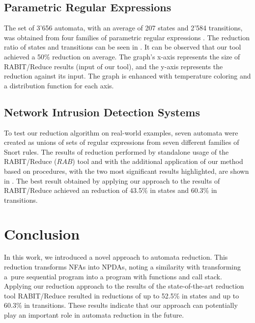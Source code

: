 \documentclass{ExcelAtFIT}
\begin{document}
	\subsection{Parametric Regular Expressions}
		The set of 3'656 automata, with an average of 207 states and 2'584 transitions, was obtained from four families of parametric regular expressions \cite{Regex_param}. The reduction ratio of states and transitions can be seen in . It can be observed that our tool achieved a 50\% reduction on average. The graph's x-axis represents the size of RABIT/Reduce results (input of our tool), and the y-axis represents the reduction against its input. The graph is enhanced with temperature coloring and a distribution function for each axis.

	\subsection{Network Intrusion Detection Systems}
		To test our reduction algorithm on real-world examples, seven automata were created as unions of sets of regular expressions from seven different families of Snort rules. The results of reduction performed by standalone usage of the RABIT/Reduce ($RAB$) tool and with the additional application of our method based on procedures, with the two most significant results highlighted, are shown in . The best result obtained by applying our approach to the results of RABIT/Reduce achieved an reduction of 43.5\% in states and 60.3\% in transitions.

\section{Conclusion}
	In this work, we introduced a novel approach to automata reduction. This reduction transforms NFAs into NPDAs, noting a similarity with transforming a~pure sequential program into a program with functions and call stack. Applying our reduction approach to the results of the state-of-the-art reduction tool RABIT/Reduce resulted in reductions of up to 52.5\% in states and up to 60.3\% in transitions. These results indicate that our approach can potentially play an important role in automata reduction in the future.






\end{document}
